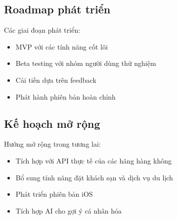 \subsection{Roadmap phát triển}
Các giai đoạn phát triển:

\begin{itemize}[leftmargin=1cm]
    \item MVP với các tính năng cốt lõi
    \item Beta testing với nhóm người dùng thử nghiệm
    \item Cải tiến dựa trên feedback
    \item Phát hành phiên bản hoàn chỉnh
\end{itemize}

\subsection{Kế hoạch mở rộng}
Hướng mở rộng trong tương lai:

\begin{itemize}[leftmargin=1cm]
    \item Tích hợp với API thực tế của các hãng hàng không
    \item Bổ sung tính năng đặt khách sạn và dịch vụ du lịch
    \item Phát triển phiên bản iOS
    \item Tích hợp AI cho gợi ý cá nhân hóa
\end{itemize}